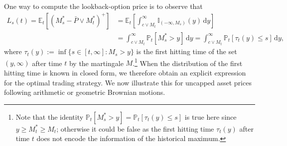 \documentclass[11pt]{article}
\theoremstyle{definition}
\theoremstyle{remark}
\newcommand{\E}{\mathbb{E}} %
\renewcommand{\P}{\mathbb{P}} %
\newcommand{\I}{\mathbb{I}} %
\newcommand{\de}{\,\mathrm{d}}
\begin{document}
One way to compute the lookback-option price is to observe that
\begin{align*}
L_s(t) = \E_t\left[(M^*_s-\bar{P}\vee M^*_t)^+\right] &= \E_t \left[\int_{c\vee M_t}^{\infty}\I_{(-\infty,M_s)}(y) \de y\right]\\  %
 &= \int_{c\vee M_t}^\infty \P_t[M^*_s > y] \de y= \int_{c\vee M_t}^\infty \P_t[\tau_t(y) \le s] \de y,
\end{align*}
where $\tau_t(y):=\inf\{s\in[t,\infty] : M_s> y\}$ is the first hitting time of the set $(y,\infty)$ after time $t$ by the martingale $M$.\footnote{Note that the identity $\P_t[M^*_s > y] = \P_t[\tau_t(y)\le s]$ is true here since $y\ge M^*_t\ge M_t$; otherwise it could be false as the first hitting time $\tau_t(y)$ after time $t$ does not encode the information of the historical maximum.} When the distribution of the first hitting time is known in closed form, we therefore obtain an explicit expression for the optimal trading strategy. We now illustrate this for uncapped asset prices following arithmetic or geometric Brownian motions.
\end{document}
